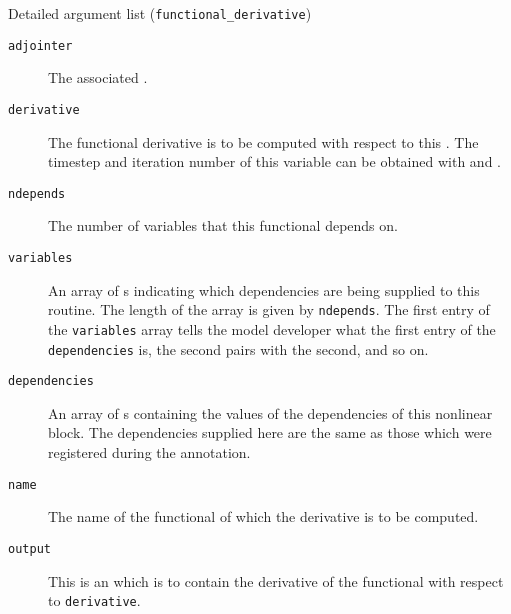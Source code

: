 \begin{boxwithtitle}{Detailed argument list (\texttt{functional_derivative})}
\begin{description}
\item[\texttt{adjointer}] The associated .
\item[\texttt{derivative}] The functional derivative is to be computed with respect to this . The timestep and iteration number of this variable can be obtained with  and .
\item[\texttt{ndepends}] The number of variables that this functional depends on.
\item[\texttt{variables}] An array of s indicating which dependencies are being supplied to this routine. The length of the
array is given by \texttt{ndepends}. The first entry of the \texttt{variables} array
tells the model developer what the first entry of the \texttt{dependencies} is, the second pairs with the second, and so on.
\item[\texttt{dependencies}] An array of s containing the values of the dependencies of this nonlinear block. The dependencies supplied
here are the same as those which were registered during the annotation.
\item[\texttt{name}] The name of the functional of which the derivative is to be computed.
\item[\texttt{output}] This is an  which is to contain the derivative of the functional with respect to \texttt{derivative}. 
\end{description}
\end{boxwithtitle}
